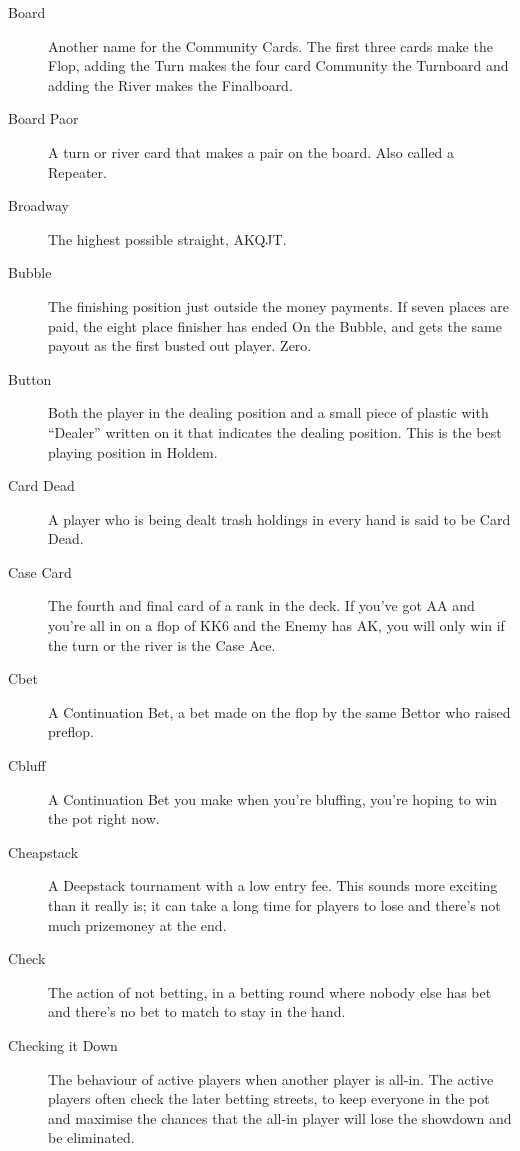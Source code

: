 \begin{description}
\item[Board] Another name for the Community Cards. The first three
cards make the Flop, adding the Turn makes the four card Community the
Turnboard and adding the River makes the Finalboard.

\item[Board Paor] A turn or river card that makes a pair on the
board. Also called a Repeater.

\item[Broadway] The highest possible straight, AKQJT.

\item[Bubble] The finishing position just outside the money payments.
If seven places are paid, the eight place finisher has ended On the
Bubble, and gets the same payout as the first busted out player. Zero.

\item[Button] Both the player in the dealing position and a small
piece of plastic with ``Dealer'' written on it that indicates the
dealing position. This is the best playing position in Holdem.

\item[Card Dead] A player who is being dealt trash holdings in every
hand is said to be Card Dead.

\item[Case Card] The fourth and final card of a rank in the deck. If
you've got AA and you're all in on a flop of KK6 and the Enemy has AK,
you will only win if the turn or the river is the Case Ace.

\item[Cbet] A Continuation Bet, a bet made on the flop by the same Bettor
who raised preflop.

\item[Cbluff] A Continuation Bet you make when you're bluffing, you're
hoping to win the pot right now.

\item[Cheapstack] A Deepstack tournament with a low entry fee. This
sounds more exciting than it really is; it can take a long time for
players to lose and there's not much prizemoney at the end.

\item[Check] The action of not betting, in a betting round where
nobody else has bet and there's no bet to match to stay in the hand.

\item[Checking it Down] The behaviour of active players when another
player is all-in. The active players often check the later betting
streets, to keep everyone in the pot and maximise the chances that the
all-in player will lose the showdown and be eliminated.


\end{description}
